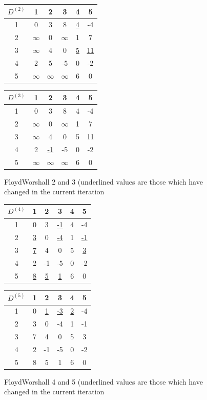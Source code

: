 \documentclass[12pt,letterpaper]{article}
\begin{document}
\begin{figure}[h]
\centering
\begin{tabular}{|c|c|c|c|c|c|} \hline
$D^{(2)}$&1&2&3&4&5\\ \hline \hline
1&0&3&8&\underline{4}&-4\\ \hline
2&$\infty$&0&$\infty$&1&7\\ \hline
3&$\infty$&4&0&\underline{5}&\underline{11}\\ \hline
4&2&5&-5&0&-2\\ \hline
5&$\infty$&$\infty$&$\infty$&6&0\\ \hline
\end{tabular}
\begin{tabular}{|c|c|c|c|c|c|} \hline
$D^{(3)}$&1&2&3&4&5\\ \hline \hline
1&0&3&8&4&-4\\ \hline
2&$\infty$&0&$\infty$&1&7\\ \hline
3&$\infty$&4&0&5&11\\ \hline
4&2&\underline{-1}&-5&0&-2\\ \hline
5&$\infty$&$\infty$&$\infty$&6&0\\ \hline
\end{tabular}
\caption{FloydWorshall 2 and 3 (underlined values are those which have changed in the current iteration}
\end{figure}
\begin{figure}[h]
\centering
\begin{tabular}{|c|c|c|c|c|c|} \hline
$D^{(4)}$&1&2&3&4&5\\ \hline \hline
1&0&3&\underline{-1}&4&-4\\ \hline
2&\underline{3}&0&\underline{-4}&1&\underline{-1}\\ \hline
3&\underline{7}&4&0&5&\underline{3}\\ \hline
4&2&-1&-5&0&-2\\ \hline
5&\underline{8}&\underline{5}&\underline{1}&6&0\\ \hline
\end{tabular}
\begin{tabular}{|c|c|c|c|c|c|} \hline
$D^{(5)}$&1&2&3&4&5\\ \hline \hline
1&0&\underline{1}&\underline{-3}&\underline{2}&-4\\ \hline
2&3&0&-4&1&-1\\ \hline
3&7&4&0&5&3\\ \hline
4&2&-1&-5&0&-2\\ \hline
5&8&5&1&6&0\\ \hline
\end{tabular}
\caption{FloydWorshall 4 and 5 (underlined values are those which have changed in the current iteration}
\end{figure}
\FloatBarrier
\end{document}
